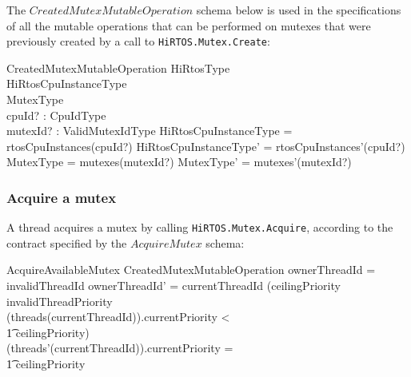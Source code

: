 \documentclass[11pt,letterpaper,twoside,openany]{book}
\begin{document}
The $CreatedMutexMutableOperation$ schema below is used in the specifications of all the mutable
operations that can be performed on mutexes that were previously created by a call to
\verb'HiRTOS.Mutex.Create':

\begin{schema}{CreatedMutexMutableOperation}
   \Delta HiRtosType \\
   \Delta HiRtosCpuInstanceType \\
   \Delta MutexType \\
   cpuId? : CpuIdType \\
   mutexId? : ValidMutexIdType
\where
   \theta HiRtosCpuInstanceType = rtosCpuInstances(cpuId?)
\also
   \theta HiRtosCpuInstanceType' = rtosCpuInstances'(cpuId?)
\also
   \theta MutexType = mutexes(mutexId?)
\also
   \theta MutexType' = mutexes'(mutexId?)
\end{schema}

\subsubsection{Acquire a mutex}

A thread acquires a mutex by calling \verb`HiRTOS.Mutex.Acquire`, according to the contract
specified by the $AcquireMutex$ schema:

\begin{schema}{AcquireAvailableMutex}
   CreatedMutexMutableOperation
\where
   ownerThreadId = invalidThreadId
\also
   ownerThreadId' = currentThreadId
\also
(ceilingPriority \neq invalidThreadPriority \land \\
 (threads(currentThreadId)).currentPriority < \\
 \t1    ceilingPriority) \implies \\
 (threads'(currentThreadId)).currentPriority = \\
 \t1    ceilingPriority
\end{schema}
\end{document}
